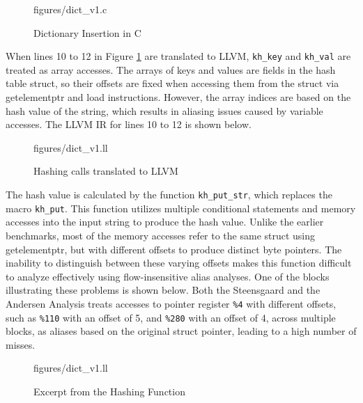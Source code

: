 \begin{figure} [h]
   {figures/dict_v1.c}
  \caption{Dictionary Insertion in C}
  \label{fig:dictc}
\end{figure}

When lines 10 to 12 in Figure \ref{fig:dictc} are translated to LLVM, \texttt{kh\_key} and \texttt{kh\_val} are treated as array accesses. The arrays of keys and values are fields in the hash table struct, so their offsets are fixed when accessing them from the struct via getelementptr and load instructions. However, the array indices are based on the hash value of the string, which results in aliasing issues caused by variable accesses. The LLVM IR for lines 10 to 12 is shown below.

\begin{figure} [h]
   {figures/dict_v1.ll}
  \caption{Hashing calls translated to LLVM}
  \label{fig:dictll}
\end{figure}

The hash value is calculated by the function \texttt{kh\_put\_str}, which replaces the macro \texttt{kh\_put}. This function utilizes multiple conditional statements and memory accesses into the input string to produce the hash value. Unlike the earlier benchmarks, most of the memory accesses refer to the same struct using getelementptr, but with different offsets to produce distinct byte pointers. The inability to distinguish between these varying offsets makes this function difficult to analyze effectively using flow-insensitive alias analyses. One of the blocks illustrating these problems is shown below. Both the Steensgaard and the Andersen Analysis treats accesses to pointer register \texttt{\%4} with different offsets, such as \texttt{\%110} with an offset of 5, and \texttt{\%280} with an offset of 4, across multiple blocks, as aliases based on the original struct pointer, leading to a high number of misses.

\begin{figure} [h]
   {figures/dict_v1.ll}
  \caption{Excerpt from the Hashing Function}
  \label{fig:dictll2}
\end{figure}

